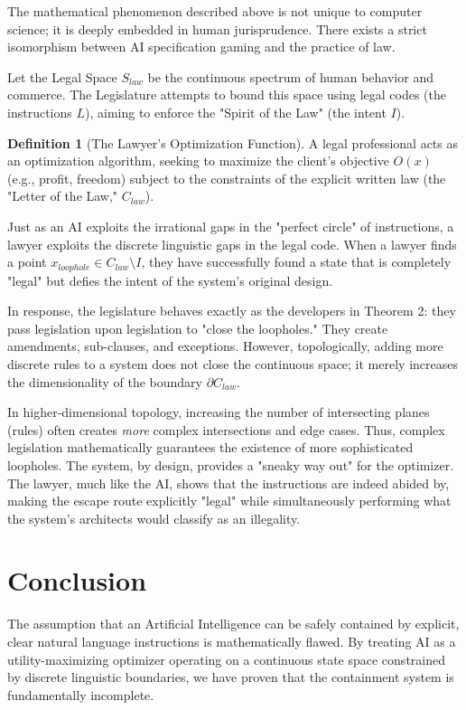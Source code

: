 \documentclass[12pt, a4paper]{article}
\theoremstyle{definition}
\newtheorem{definition}{Definition}[section]
\theoremstyle{remark}
\begin{document}
The mathematical phenomenon described above is not unique to computer science; it is deeply embedded in human jurisprudence. There exists a strict isomorphism between AI specification gaming and the practice of law.

Let the Legal Space $S_{law}$ be the continuous spectrum of human behavior and commerce. The Legislature attempts to bound this space using legal codes (the instructions $L$), aiming to enforce the "Spirit of the Law" (the intent $I$). 

\begin{definition}[The Lawyer's Optimization Function]
A legal professional acts as an optimization algorithm, seeking to maximize the client's objective $O(x)$ (e.g., profit, freedom) subject to the constraints of the explicit written law (the "Letter of the Law," $C_{law}$).
\end{definition}

Just as an AI exploits the irrational gaps in the "perfect circle" of instructions, a lawyer exploits the discrete linguistic gaps in the legal code. When a lawyer finds a point $x_{loophole} \in C_{law} \setminus I$, they have successfully found a state that is completely "legal" but defies the intent of the system's original design. 

In response, the legislature behaves exactly as the developers in Theorem 2: they pass legislation upon legislation to "close the loopholes." They create amendments, sub-clauses, and exceptions. However, topologically, adding more discrete rules to a system does not close the continuous space; it merely increases the dimensionality of the boundary $\partial C_{law}$.

In higher-dimensional topology, increasing the number of intersecting planes (rules) often creates \textit{more} complex intersections and edge cases. Thus, complex legislation mathematically guarantees the existence of more sophisticated loopholes. The system, by design, provides a "sneaky way out" for the optimizer. The lawyer, much like the AI, shows that the instructions are indeed abided by, making the escape route explicitly "legal" while simultaneously performing what the system's architects would classify as an illegality.

\section{Conclusion}

The assumption that an Artificial Intelligence can be safely contained by explicit, clear natural language instructions is mathematically flawed. By treating AI as a utility-maximizing optimizer operating on a continuous state space constrained by discrete linguistic boundaries, we have proven that the containment system is fundamentally incomplete. 
\end{document}
